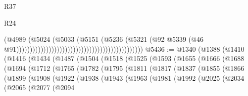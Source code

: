 \begin{lexlean}{R37}
\begin{lexlean}{R24}
\begin{coremodule}
{{{{{{{{{{{{{{{{{{{{{{{{{{{{{{{{{{{{{{{{{{{{{{{{{{{{{{{{{{{{{{{{{{{{{{{{{{{{{{{{{{{{{{{{{{{{{{{{{{{{{{{{{{{{{{{{{{{{{{{{{{{{{{{{{{{{{{{{{{{{{{{{{{{{{{{{{{{{{{{{{{{{{{{{{{{{{{{{{{{{{{{{{                                                                                  (@4989
                                                                                    (@5024
                                                                                      (@5033
                                                                                        (@5151
                                                                                          (@5236
                                                                                            (@5321
                                                                                              (@92
                                                                                                @5339
                                                                                                (@46
                                                                                                  @91)))))))))))))))))))))))))))))))))))))))))))))))
@5436 := @1340
    (@1388
      (@1410
        (@1416
          (@1434
            (@1487
              (@1504
                (@1518
                  (@1525
                    (@1593
                      (@1655
                        (@1666
                          (@1688
                            (@1694
                              (@1712
                                (@1765
                                  (@1782
                                    (@1795
                                      (@1811
                                        (@1817
                                          (@1837
                                            (@1855
                                              (@1866
                                                (@1899
                                                  (@1908
                                                    (@1922
                                                      (@1938
                                                        (@1943
                                                          (@1963
                                                            (@1981
                                                              (@1992
                                                                (@2025
                                                                  (@2034
                                                                    (@2065
                                                                      (@2077
                                                                        (@2094
}}}}}}}}}}}}}}}}}}}}}}}}}}}}}}}}}}}}}}}}}}}}}}}}}}}}}}}}}}}}}}}}}}}}}}}}}}}}}}}}}}}}}}}}}}}}}}}}}}}}}}}}}}}}}}}}}}}}}}}}}}}}}}}}}}}}}}}}}}}}}}}}}}}}}}}}}}}}}}}}}}}}}}}}}}}}}}}}}}}}}}}}}
\end{coremodule}
\end{lexlean}
\end{lexlean}
